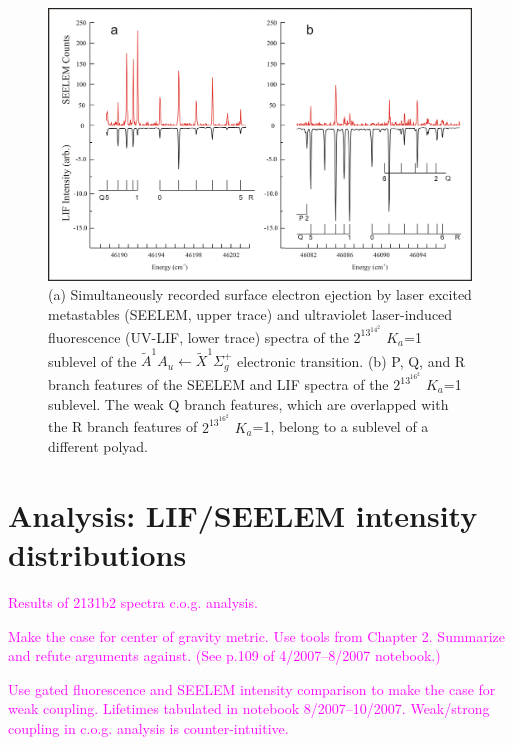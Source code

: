 \documentclass[12pt,draft]{mitthesis}
\newcommand{\POINT}[1]{\textcolor{magenta}{#1}}
\begin{document}
\begin{figure}
  \caption{
    (a) Simultaneously recorded surface electron ejection by laser 
    excited metastables (SEELEM, upper trace) and ultraviolet 
    laser-induced fluorescence (UV-LIF, lower trace) spectra of the 
    $2^13^14^2$ $K_a$=1 sublevel of the $\tilde{A}^1A_u \leftarrow
    \tilde{X} ^1\Sigma_g^+$ electronic transition.  (b) P, Q, and R
    branch features of the SEELEM and LIF spectra of the $2^13^16^2$ 
    $K_a$=1 sublevel. The weak Q branch features, which are overlapped 
    with the R branch features of $2^13^16^2$ $K_a$=1, belong to a 
    sublevel of a different polyad.
  }
  \label{fig:spectrum-2131b2}
  \centering
  \includegraphics[width=7.5in,angle=90]{spectrum-2131b2.png}
\end{figure}

\section{Analysis: LIF/SEELEM intensity distributions}

\POINT{Results of 2131b2 spectra c.o.g. analysis.}

\POINT{Make the case for center of gravity metric. Use tools from
  Chapter 2.  Summarize and refute arguments against.  (See p.109 of
  4/2007--8/2007 notebook.)}

\POINT{Use gated fluorescence and SEELEM intensity comparison to make
  the case for weak coupling. Lifetimes tabulated in notebook
  8/2007--10/2007.  Weak/strong coupling in c.o.g. analysis is
  counter-intuitive.}
\end{document}
